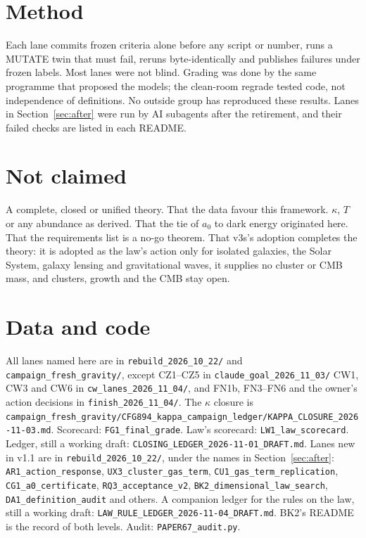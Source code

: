 \documentclass[10pt]{article}
\begin{document}
\section{Method}
Each lane commits frozen criteria alone before any script or number, runs a MUTATE twin that must fail, reruns byte-identically and publishes failures under frozen labels. Most lanes were not blind. Grading was done by the same programme that proposed the models; the clean-room regrade tested code, not independence of definitions. No outside group has reproduced these results. Lanes in Section~\ref{sec:after} were run by AI subagents after the retirement, and their failed checks are listed in each README.

\section*{Not claimed}
A complete, closed or unified theory. That the data favour this framework. $\kappa$, $T$ or any abundance as derived. That the tie of $a_0$ to dark energy originated here. That the requirements list is a no-go theorem. That v3s's adoption completes the theory: it is adopted as the law's action only for isolated galaxies, the Solar System, galaxy lensing and gravitational waves, it supplies no cluster or CMB mass, and clusters, growth and the CMB stay open.

\section*{Data and code}
All lanes named here are in \texttt{rebuild\_2026\_10\_22/} and \texttt{campaign\_fresh\_gravity/}, except CZ1--CZ5 in \texttt{claude\_goal\_2026\_11\_03/} CW1, CW3 and CW6 in \texttt{cw\_lanes\_2026\_11\_04/}, and FN1b, FN3--FN6 and the owner's action decisions in \texttt{finish\_2026\_11\_04/}. The $\kappa$ closure is \texttt{campaign\_fresh\_gravity/CFG894\_kappa\_campaign\_ledger/KAPPA\_CLOSURE\_2026-11-03.md}. Scorecard: \texttt{FG1\_final\_grade}. Law's scorecard: \texttt{LW1\_law\_scorecard}. Ledger, still a working draft: \texttt{CLOSING\_LEDGER\_2026-11-01\_DRAFT.md}. Lanes new in v1.1 are in \texttt{rebuild\_2026\_10\_22/}, under the names in Section~\ref{sec:after}: \texttt{AR1\_action\_response}, \texttt{UX3\_cluster\_gas\_term}, \texttt{CU1\_gas\_term\_replication}, \texttt{CG1\_a0\_certificate}, \texttt{RQ3\_acceptance\_v2}, \texttt{BK2\_dimensional\_law\_search}, \texttt{DA1\_definition\_audit} and others. A companion ledger for the rules on the law, still a working draft: \texttt{LAW\_RULE\_LEDGER\_2026-11-04\_DRAFT.md}. BK2's README is the record of both levels. Audit: \texttt{PAPER67\_audit.py}.
\end{document}
